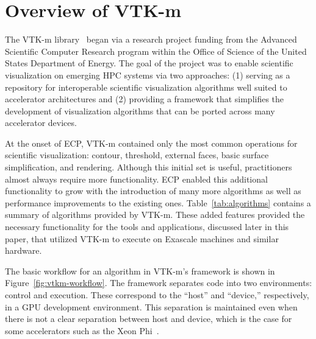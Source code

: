 \section{Overview of VTK-m}


The VTK-m library~\cite{Moreland2016} began via a research project funding
from the 
Advanced Scientific Computer Research program within the Office of Science of the
United States Department of Energy.
The goal of the project was to enable scientific visualization on emerging HPC systems via
two approaches:
(1) serving as a repository for interoperable scientific visualization algorithms well suited to accelerator architectures and (2) providing a framework that simplifies the development of visualization algorithms that can be ported across many accelerator devices.



At the onset of ECP, VTK-m contained only the most common operations for scientific visualization: contour, threshold, external faces, basic surface simplification, and rendering.
Although this initial set is useful, practitioners almost always require more functionality.
ECP enabled this additional functionality to grow with the introduction of many more algorithms as well as performance improvements to the existing ones.
Table~\ref{tab:algorithms} contains a summary of algorithms provided by VTK-m.
These added features provided the necessary functionality for the tools and applications, discussed later in this paper, that utilized VTK-m to execute on Exascale machines and similar hardware.


The basic workflow for an algorithm in VTK-m's framework is shown in Figure~\ref{fig:vtkm-workflow}.
The framework separates code into two environments: control and execution.
These correspond to the ``host'' and ``device,'' respectively, in a GPU development environment.
This separation is maintained even when 
there is not a clear separation between host and device, which is the case for some accelerators such as the Xeon Phi~\cite{Jeffers2016}.


